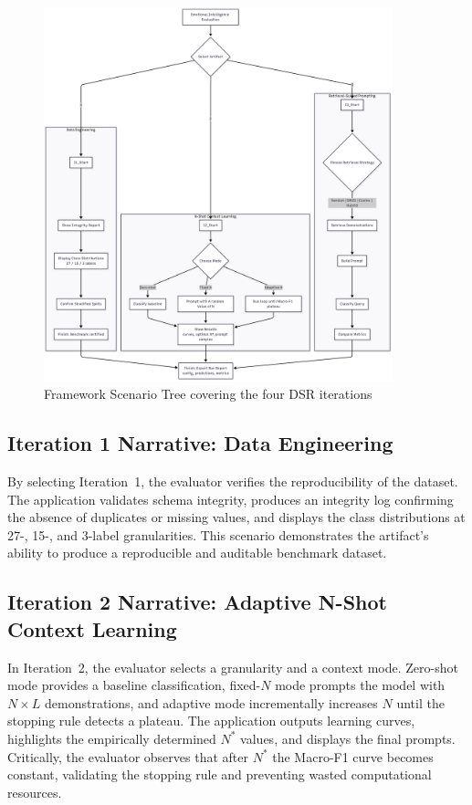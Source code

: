 \begin{figure}[h]
    \centering
    \includegraphics[width=0.9\textwidth]{Images/DecisionTree.png}
    \caption{Framework Scenario Tree covering the four DSR iterations}
    \label{fig:scenario_tree}
\end{figure}

\subsection{Iteration 1 Narrative: Data Engineering}
By selecting Iteration~1, the evaluator verifies the reproducibility of the dataset. The application validates schema integrity, produces an integrity log confirming the absence of duplicates or missing values, and displays the class distributions at 27-, 15-, and 3-label granularities. This scenario demonstrates the artifact’s ability to produce a reproducible and auditable benchmark dataset.  

\subsection{Iteration 2 Narrative: Adaptive N-Shot Context Learning}
In Iteration~2, the evaluator selects a granularity and a context mode. Zero-shot mode provides a baseline classification, fixed-$N$ mode prompts the model with $N \times L$ demonstrations, and adaptive mode incrementally increases $N$ until the stopping rule detects a plateau. The application outputs learning curves, highlights the empirically determined $N^{\ast}$ values, and displays the final prompts. Critically, the evaluator observes that after $N^{\ast}$ the Macro-F1 curve becomes constant, validating the stopping rule and preventing wasted computational resources.  

